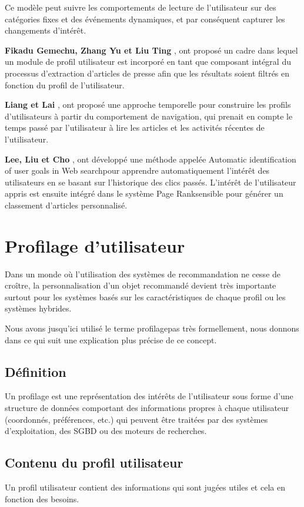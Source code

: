 Ce modèle peut suivre les comportements de lecture de l'utilisateur sur des catégories fixes et des événements dynamiques, et par conséquent capturer les changements d'intérêt.

\textbf{Fikadu Gemechu, Zhang Yu et Liu Ting} \cite{34}, ont proposé un cadre dans lequel un module de profil utilisateur est incorporé en tant que composant intégral du processus d'extraction d'articles de presse afin que les résultats soient filtrés en fonction du profil de l'utilisateur.

\textbf{Liang et Lai} \cite{35}, ont proposé une approche temporelle pour construire les profils d'utilisateurs à partir du comportement de navigation, qui prenait en compte le temps passé par l'utilisateur à lire les articles et les activités récentes de l'utilisateur.

\textbf{Lee, Liu et Cho} \cite{36}, ont développé une méthode appelée \textquotedbl Automatic identification of user goals in Web search\textquotedbl pour apprendre automatiquement l'intérêt des utilisateurs en se basant sur l'historique des clics passés. L'intérêt de l'utilisateur appris est ensuite intégré dans le système \textquotedbl Page Rank\textquotedbl sensible pour générer un classement d'articles personnalisé.


\section{Profilage d'utilisateur}
Dans un monde où l'utilisation des systèmes de recommandation ne cesse de croître, la personnalisation d'un objet recommandé devient très importante surtout pour les systèmes basés sur les caractéristiques de chaque profil ou les systèmes hybrides.

Nous avons jusqu'ici utilisé le terme \textquotedbl profilage\textquotedbl pas très formellement, nous donnons dans ce qui suit une explication plus précise de ce concept.

\subsection{Définition}
Un profilage est une représentation des intérêts de l'utilisateur sous forme d'une structure de données comportant des informations propres à chaque utilisateur (coordonnés, préférences, etc.) qui peuvent être traitées par des systèmes d'exploitation, des SGBD ou des moteurs de recherches.

\subsection{Contenu du profil utilisateur}
Un profil utilisateur contient des informations qui sont jugées utiles et cela en fonction des besoins.

